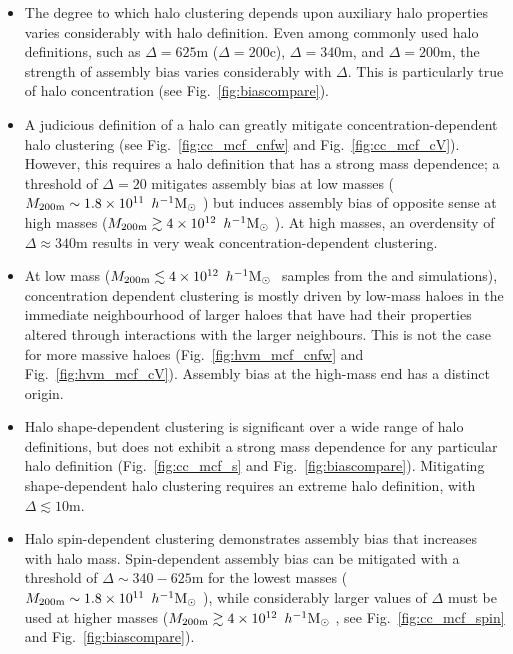 \documentclass[usenatbib,fleqn]{mnras}
\begin{document}
\begin{itemize}
    
  	\item The degree to which halo clustering depends upon auxiliary halo properties varies considerably with halo definition. Even among commonly used halo definitions, such as $\Delta=625$m ($\Delta=200$c), $\Delta=340$m, and $\Delta=200$m, the strength of assembly bias varies considerably with $\Delta$. This is particularly true of halo concentration (see Fig.~\ref{fig:biascompare}). \\
    
    \item A judicious definition of a halo can greatly mitigate concentration-dependent halo clustering (see Fig.~\ref{fig:cc_mcf_cnfw} and Fig.~\ref{fig:cc_mcf_cV}). However, this requires a halo definition that has a strong mass dependence; a threshold of $\Delta=20$ mitigates assembly bias at low masses 
($M_{200\text{m}} \sim 1.8 \times 10^{11}\, \ h^{-1}\mathrm{M}_{\odot}~$) but induces assembly bias of opposite sense at high masses ($M_{200\text{m}} \gtrsim 4 \times 10^{12}\, \ h^{-1}\mathrm{M}_{\odot}~$). 
At high masses, an overdensity of $\Delta \approx 340$m results in 
very weak concentration-dependent clustering.\\

	\item At low mass ($M_{200{\rm m}} \lesssim 4 \times 10^{12}\, \ h^{-1}\mathrm{M}_{\odot}~$ samples from the \simA{} and \simB{} simulations), concentration dependent clustering is mostly driven by low-mass haloes in the immediate neighbourhood of larger haloes that have had their properties altered through interactions with the larger neighbours. This is not the case for more massive haloes (Fig.~\ref{fig:hvm_mcf_cnfw} and Fig.~\ref{fig:hvm_mcf_cV}). Assembly bias at the high-mass end has a distinct origin.\\
    
    \item Halo shape-dependent clustering is significant over a wide range of halo definitions, but does not exhibit a strong mass dependence for any particular halo definition (Fig.~\ref{fig:cc_mcf_s} and Fig.~\ref{fig:biascompare}). Mitigating shape-dependent halo clustering requires an extreme halo definition, with $\Delta \lesssim 10$m.\\
    
    \item Halo spin-dependent clustering demonstrates assembly bias that increases with halo mass. Spin-dependent assembly bias can be mitigated with a threshold of 
$\Delta \sim 340-625$m for the lowest masses ($M_{200\text{m}} \sim 1.8 \times10^{11}\, \ h^{-1}\mathrm{M}_{\odot}~$), while considerably larger values of $\Delta$ must be used at higher masses 
($M_{200\text{m}} \gtrsim 4 \times 10^{12}\, \ h^{-1}\mathrm{M}_{\odot}~$, see Fig.~\ref{fig:cc_mcf_spin} and Fig.~\ref{fig:biascompare}).\\


\end{itemize}
\end{document}
